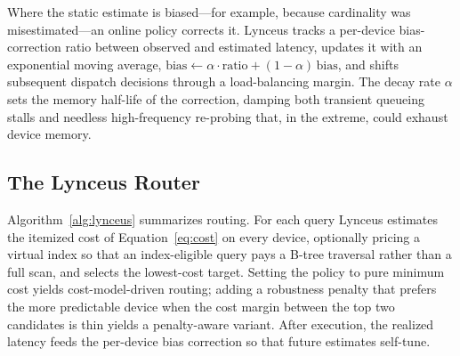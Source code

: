 \documentclass{article}
\begin{document}
Where the static estimate is biased---for example, because cardinality was
misestimated---an online policy corrects it. Lynceus tracks a per-device
bias-correction ratio between observed and estimated latency, updates it with an
exponential moving average, $\mathrm{bias} \gets \alpha \cdot \mathrm{ratio} +
(1-\alpha)\,\mathrm{bias}$, and shifts subsequent dispatch decisions through a
load-balancing margin. The decay rate $\alpha$ sets the memory half-life of the
correction, damping both transient queueing stalls and needless high-frequency
re-probing that, in the extreme, could exhaust device memory.

\subsection{The Lynceus Router}
\label{sec:router}

Algorithm~\ref{alg:lynceus} summarizes routing. For each query Lynceus estimates
the itemized cost of Equation~\eqref{eq:cost} on every device, optionally pricing
a virtual index so that an index-eligible query pays a B-tree traversal rather
than a full scan, and selects the lowest-cost target. Setting the policy to pure
minimum cost yields cost-model-driven routing; adding a robustness penalty that
prefers the more predictable device when the cost margin between the top two
candidates is thin yields a penalty-aware variant. After execution, the realized
latency feeds the per-device bias correction so that future estimates self-tune.
\end{document}
